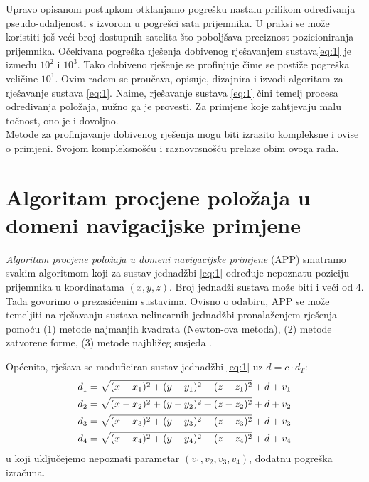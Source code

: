 \documentclass[a4paper,twoside,12pt]{memoir} %
\begin{document}
	Upravo opisanom postupkom otklanjamo pogrešku nastalu prilikom 
	određivanja pseudo-udaljenosti 
	s izvorom u pogrešci sata prijemnika.
	U praksi se može koristiti još veći broj dostupnih satelita što poboljšava 
	preciznost pozicioniranja prijemnika. Očekivana pogreška rješenja dobivenog rješavanjem sustava\ref{eq:1} je između $10^2$ i $10^3$. Tako dobiveno rješenje se profinjuje čime se postiže pogreška veličine $10^1$.
	Ovim radom se proučava, opisuje, dizajnira i izvodi algoritam za rješavanje sustava \ref{eq:1}.
	Naime, rješavanje sustava \ref{eq:1} čini temelj procesa određivanja položaja, nužno ga je provesti.
	Za primjene koje zahtjevaju malu točnost, ono je i dovoljno.\\
	Metode za profinjavanje dobivenog rješenja mogu biti izrazito kompleksne i ovise o primjeni. Svojom kompleksnošću i raznovrsnošću prelaze obim ovoga rada.\\

\chapter[Algoritam procjene položaja (APP)]{Algoritam procjene položaja u domeni navigacijske primjene}\label{sec:algoritam}

\textit{Algoritam procjene položaja u domeni navigacijske primjene} (APP)
smatramo svakim algoritmom koji za sustav jednadžbi \ref{eq:1}
određuje nepoznatu poziciju prijemnika u koordinatama $(x,y,z)$.
Broj jednadži sustava može biti i veći od 4. Tada govorimo o prezasićenim sustavima.
Ovisno o odabiru, APP se može temeljiti na rješavanju sustava nelinearnih jednadžbi pronalaženjem rješenja pomoću (1) metode najmanjih kvadrata (Newton-ova metoda),
(2) metode zatvorene forme, (3) metode najbližeg susjeda \cite{math:positioning}. 

Općenito, rješava se moduficiran sustav jednadžbi \ref{eq:1} uz $d = c \cdot d_T$:\\
\begin{align}\label{eq:new}
d_1 = \sqrt{(x-x_1)^{2}+(y-y_1)^{2}+(z-z_1)^{2}} +d + v_1\notag \\
d_2 = \sqrt{(x-x_2)^{2}+(y-y_2)^{2}+(z-z_2)^{2}} +d + v_2 \\
d_3 = \sqrt{(x-x_3)^{2}+(y-y_3)^{2}+(z-z_3)^{2}} +d + v_3\notag \\
d_4 = \sqrt{(x-x_4)^{2}+(y-y_4)^{2}+(z-z_4)^{2}} +d + v_4\notag
\end{align}
u koji uključejemo nepoznati parametar $(v_1,v_2,v_3,v_4)$, dodatnu pogreška
izračuna.
\end{document}
